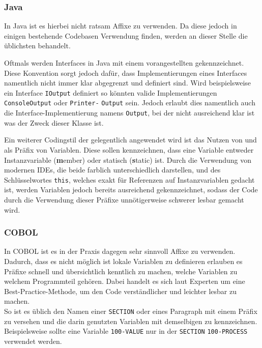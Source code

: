 \subsubsection*{Java}
In Java ist es hierbei nicht ratsam Affixe zu verwenden. Da diese jedoch in einigen bestehende Codebasen Verwendung finden, werden an dieser Stelle die üblichsten behandelt.

Oftmals werden Interfaces in Java mit einem vorangestellten  gekennzeichnet. Diese Konvention sorgt jedoch dafür, dass Implementierungen eines Interfaces namentlich nicht immer klar abgegrenzt und definiert sind. Wird beispielsweise ein Interface \texttt{IOutput} definiert so könnten valide Implementierungen \texttt{ConsoleOutput} oder \texttt{Printer-} \texttt{Output} sein. Jedoch erlaubt dies namentlich auch die Interface-Implementierung namens \texttt{Output}, bei der nicht ausreichend klar ist was der Zweck dieser Klasse ist.

Ein weiterer Codingstil der gelegentlich angewendet wird ist das Nutzen von  und  als Präfix von Variablen. Diese sollen kennzeichnen, dass eine Variable entweder Instanzvariable (\textbf{m}ember) oder statisch (\textbf{s}tatic) ist. Durch die Verwendung von modernen IDEs, die beide farblich unterschiedlich darstellen, und des Schlüsselwortes \texttt{this}, welches exakt für Referenzen auf Instanzvariablen gedacht ist, werden Variablen jedoch bereits ausreichend gekennzeichnet, sodass der Code durch die Verwendung dieser Präfixe unnötigerweise schwerer lesbar gemacht wird.

\subsubsection*{COBOL}\label{affixCOBOL}
In COBOL ist es in der Praxis dagegen sehr sinnvoll Affixe zu verwenden. Dadurch, dass es nicht möglich ist lokale Variablen zu definieren erlauben es Präfixe schnell und übersichtlich kenntlich zu machen, welche Variablen zu welchem Programmteil gehören. Dabei handelt es sich laut Experten um eine Best-Practice-Methode, um den Code verständlicher und leichter lesbar zu machen.\\

So ist es üblich den Namen einer \texttt{SECTION} oder eines Paragraph mit einem Präfix zu versehen und die darin genutzten Variablen mit demselbigen zu kennzeichnen. Beispielsweise sollte eine Variable \texttt{100-VALUE} nur in der \texttt{SECTION} \texttt{100-PROCESS} verwendet werden. \\

